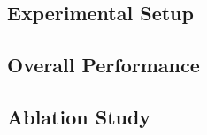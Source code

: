 \documentclass[sigconf,anonymous,review]{acmart}
\begin{document}
%
%
%
%
%
%

\subsection{Experimental Setup}

\subsection{Overall Performance}

\subsection{Ablation Study}
\end{document}
